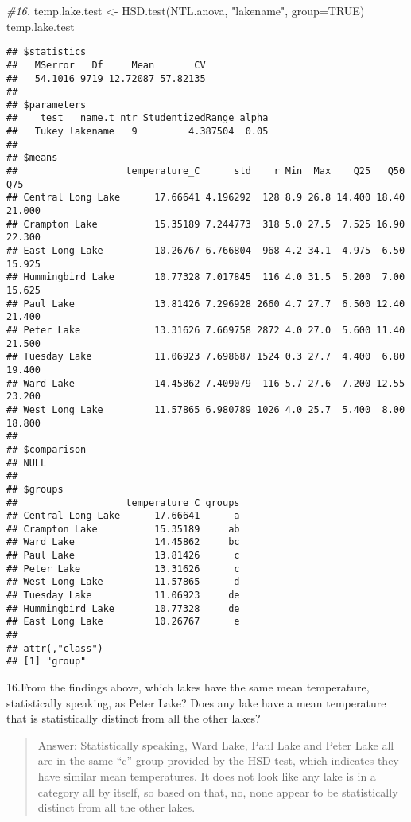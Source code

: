 \documentclass[
]{article}
\newenvironment{Shaded}{\begin{snugshade}}{\end{snugshade}}
\newcommand{\AttributeTok}[1]{\textcolor[rgb]{0.77,0.63,0.00}{#1}}
\newcommand{\CommentTok}[1]{\textcolor[rgb]{0.56,0.35,0.01}{\textit{#1}}}
\newcommand{\ConstantTok}[1]{\textcolor[rgb]{0.00,0.00,0.00}{#1}}
\newcommand{\FunctionTok}[1]{\textcolor[rgb]{0.00,0.00,0.00}{#1}}
\newcommand{\NormalTok}[1]{#1}
\newcommand{\OtherTok}[1]{\textcolor[rgb]{0.56,0.35,0.01}{#1}}
\newcommand{\StringTok}[1]{\textcolor[rgb]{0.31,0.60,0.02}{#1}}
\begin{document}
\begin{Shaded}
\begin{Highlighting}[]
\CommentTok{\#16.}
\NormalTok{temp.lake.test }\OtherTok{\textless{}{-}} \FunctionTok{HSD.test}\NormalTok{(NTL.anova, }\StringTok{"lakename"}\NormalTok{, }\AttributeTok{group=}\ConstantTok{TRUE}\NormalTok{)}
\NormalTok{temp.lake.test}
\end{Highlighting}
\end{Shaded}

\begin{verbatim}
## $statistics
##   MSerror   Df     Mean       CV
##   54.1016 9719 12.72087 57.82135
## 
## $parameters
##    test   name.t ntr StudentizedRange alpha
##   Tukey lakename   9         4.387504  0.05
## 
## $means
##                   temperature_C      std    r Min  Max    Q25   Q50    Q75
## Central Long Lake      17.66641 4.196292  128 8.9 26.8 14.400 18.40 21.000
## Crampton Lake          15.35189 7.244773  318 5.0 27.5  7.525 16.90 22.300
## East Long Lake         10.26767 6.766804  968 4.2 34.1  4.975  6.50 15.925
## Hummingbird Lake       10.77328 7.017845  116 4.0 31.5  5.200  7.00 15.625
## Paul Lake              13.81426 7.296928 2660 4.7 27.7  6.500 12.40 21.400
## Peter Lake             13.31626 7.669758 2872 4.0 27.0  5.600 11.40 21.500
## Tuesday Lake           11.06923 7.698687 1524 0.3 27.7  4.400  6.80 19.400
## Ward Lake              14.45862 7.409079  116 5.7 27.6  7.200 12.55 23.200
## West Long Lake         11.57865 6.980789 1026 4.0 25.7  5.400  8.00 18.800
## 
## $comparison
## NULL
## 
## $groups
##                   temperature_C groups
## Central Long Lake      17.66641      a
## Crampton Lake          15.35189     ab
## Ward Lake              14.45862     bc
## Paul Lake              13.81426      c
## Peter Lake             13.31626      c
## West Long Lake         11.57865      d
## Tuesday Lake           11.06923     de
## Hummingbird Lake       10.77328     de
## East Long Lake         10.26767      e
## 
## attr(,"class")
## [1] "group"
\end{verbatim}

16.From the findings above, which lakes have the same mean temperature,
statistically speaking, as Peter Lake? Does any lake have a mean
temperature that is statistically distinct from all the other lakes?

\begin{quote}
Answer: Statistically speaking, Ward Lake, Paul Lake and Peter Lake all
are in the same ``c'' group provided by the HSD test, which indicates
they have similar mean temperatures. It does not look like any lake is
in a category all by itself, so based on that, no, none appear to be
statistically distinct from all the other lakes.
\end{quote}
\end{document}
